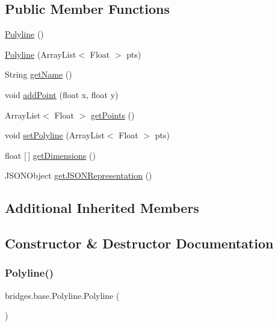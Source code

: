\subsection*{Public Member Functions}
\begin{DoxyCompactItemize}
\item 
\hyperlink{classbridges_1_1base_1_1_polyline_a8842a3d3737dfa5b26424a05dc965a4b}{Polyline} ()
\item 
\hyperlink{classbridges_1_1base_1_1_polyline_a11d14fddddd6e89e0902e94aa1bac875}{Polyline} (Array\+List$<$ Float $>$ pts)
\item 
String \hyperlink{classbridges_1_1base_1_1_polyline_a5b56cee642a6381ea940c75a336076ea}{get\+Name} ()
\item 
void \hyperlink{classbridges_1_1base_1_1_polyline_a24b99307181f1a938ea408355984d191}{add\+Point} (float x, float y)
\item 
Array\+List$<$ Float $>$ \hyperlink{classbridges_1_1base_1_1_polyline_ae610d680975558db90a06949991583f8}{get\+Points} ()
\item 
void \hyperlink{classbridges_1_1base_1_1_polyline_a3fec0c95e9f26b173cba105bd39e9df1}{set\+Polyline} (Array\+List$<$ Float $>$ pts)
\item 
float \mbox{[}$\,$\mbox{]} \hyperlink{classbridges_1_1base_1_1_polyline_a5665bd906b841ca71a668581aeb7a181}{get\+Dimensions} ()
\item 
J\+S\+O\+N\+Object \hyperlink{classbridges_1_1base_1_1_polyline_a4ac266909645f8db9b7fcc4836f6069a}{get\+J\+S\+O\+N\+Representation} ()
\end{DoxyCompactItemize}
\subsection*{Additional Inherited Members}


\subsection{Constructor \& Destructor Documentation}
\mbox{\label{classbridges_1_1base_1_1_polyline_a8842a3d3737dfa5b26424a05dc965a4b}} 
\subsubsection{\texorpdfstring{Polyline()}{Polyline()}\hspace{0.1cm}{\footnotesize\ttfamily [1/2]}}
{\footnotesize\ttfamily bridges.\+base.\+Polyline.\+Polyline (\begin{DoxyParamCaption}{ }\end{DoxyParamCaption})}

